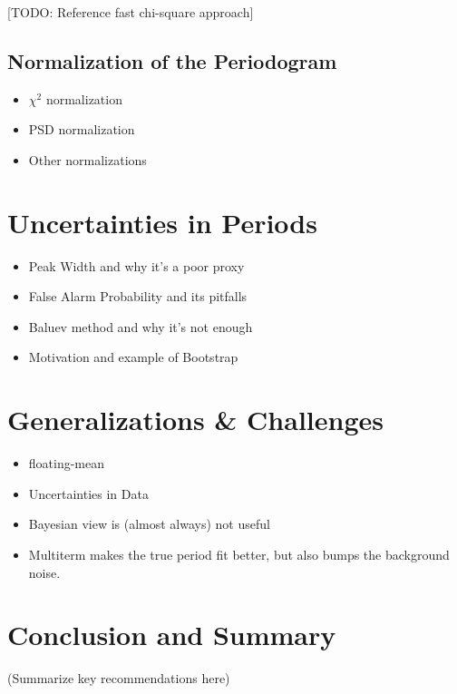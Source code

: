 \documentclass[preprint]{aastex}
\newcommand{\todo}[1]{{\color{red} [TODO: #1]}}
\newcommand{\sectlabel}[1]{\label{sect:#1}}
\begin{document}
\todo{Reference fast chi-square approach}


\subsection{Normalization of the Periodogram}

\begin{itemize}
  \item $\chi^2$ normalization
  \item PSD normalization
  \item Other normalizations \citep{Baluev2008}
\end{itemize}


\section{Uncertainties in Periods}
\sectlabel{uncertainties}

\begin{itemize}
  \item Peak Width and why it's a poor proxy
  \item False Alarm Probability and its pitfalls
  \item Baluev method and why it's not enough
  \item Motivation and example of Bootstrap
\end{itemize}


\section{Generalizations \& Challenges}
\sectlabel{generalizations}

\begin{itemize}
\item floating-mean
\item Uncertainties in Data
\item Bayesian view is (almost always) not useful
\item Multiterm makes the true period fit better, but also bumps the background noise.
\end{itemize}


\section{Conclusion and Summary}

(Summarize key recommendations here)



\end{document}

